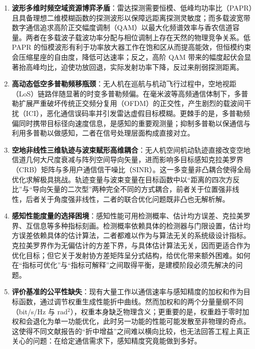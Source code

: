 \begin{enumerate}
  \item \textbf{波形多维时频空域资源博弈矛盾}：雷达探测需要恒模、低峰均功率比（PAPR）且具备理想二维模糊函数的探测波形以保障远距离探测灵敏度；而多载波宽带数字通信追求高阶正交幅度调制（QAM）以最大化频谱效率与香农信道容量。两者在多载波子载波功率分配与相位调制上存在天然的物理竞争关系。低 PAPR 的恒模波形有利于功率放大器工作在饱和区从而提高能效，但恒模约束会压缩星座的自由度，降低可达速率；反之，高阶 QAM 带来的幅度起伏会显著抬高峰均比，迫使功放回退，实际发射功率下降，反过来削弱探测距离。

  \item \textbf{高动态低空多普勒频移瓶颈}：无人机在巡航与机动飞行过程中，空地视距（LoS）链路伴随显著的时变多普勒频偏。在毫米波等高频通信体制下，多普勒扩展严重破坏传统正交频分复用（OFDM）的正交性，产生剧烈的载波间干扰（ICI），恶化通信误码率并引发雷达虚假目标模糊。更棘手的是，多普勒频偏同时携带目标径向速度信息，是感知的重要观测量；抑制多普勒以保通信与利用多普勒以做感知，二者在信号处理层面构成直接对立。

  \item \textbf{空地非线性三维轨迹与波束赋形高维耦合}：无人机空间机动轨迹直接改变空地信道几何大尺度衰减与阵列空间导向矢量，进而影响多目标感知克拉美罗界（CRB）矩阵与多用户通信信干噪比（SINR）。这一多变量非凸耦合使得全局优化求解极具挑战。轨迹变量与波束变量在目标函数中以“距离的四次方反比”与“导向矢量的二次型”两种完全不同的方式耦合，前者关于位置强非线性，后者关于角度强非线性，二者的联合优化问题既非凸也无解析解。

  \item \textbf{感知性能度量的选择困境}：感知性能可用检测概率、估计均方误差、克拉美罗界、互信息等多种指标刻画。检测概率依赖具体的检测器与门限设置，估计均方误差依赖具体的估计算法，二者都难以作为与算法无关的系统级设计指标。克拉美罗界作为无偏估计的方差下界，与具体估计算法无关，因而更适合作为优化目标；但它关于发射协方差矩阵呈分式结构，给优化带来额外困难。如何在“指标可优化”与“指标可解释”之间取得平衡，是建模阶段必须先解决的问题。

  \item \textbf{评价基准的公平性缺失}：现有大量工作以通信速率与感知精度的加权和作为目标函数，通过调节权重生成性能折中曲线。然而加权和的两个分量量纲不同（bit/s/Hz 与 rad$^{2}$），权重本身缺乏物理含义；更重要的是，权重趋于零时加权和会退化为单一功能优化，此时另一功能的性能可能发散至非物理的奇点。这使得不同文献报告的“折中增益”之间难以横向比较，也无法回答工程上真正关心的问题：在给定通信需求下，感知精度究竟能做到多好。
\end{enumerate}

